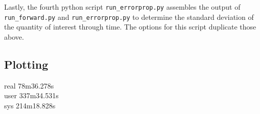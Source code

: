 \documentclass[11pt, reqno, nocenter]{article}
\begin{document}
Lastly, the fourth python script {\tt run\_errorprop.py} assembles the output of {\tt run\_forward.py} and {\tt run\_errorprop.py} to determine the standard deviation of the quantity of interest through time. The options for this script duplicate those above.

\subsection{Plotting}
real   \hspace{10mm}78m36.278s\\                                                                                                 
user   \hspace{8mm} 337m34.531s\\                                                                                                    
sys    \hspace{10mm} 214m18.828s\\
\end{document}
